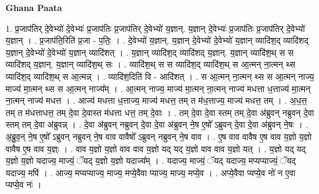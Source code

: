 \documentclass[17pt]{extarticle}
\begin{document}
\textbf{Ghana Paata } \newline

1. प्र॒जाप॑तिर् दे॒वेभ्यो॑ दे॒वेभ्यः॑ प्र॒जाप॑तिः प्र॒जाप॑तिर् दे॒वेभ्यो॑ य॒ज्ञान्. य॒ज्ञान् दे॒वेभ्यः॑ प्र॒जाप॑तिः प्र॒जाप॑तिर् दे॒वेभ्यो॑ य॒ज्ञान् । . प्र॒जाप॑ति॒रिति॑ प्र॒जा - प॒तिः॒ । . दे॒वेभ्यो॑ य॒ज्ञान्. य॒ज्ञान् दे॒वेभ्यो॑ दे॒वेभ्यो॑ य॒ज्ञान् व्यादि॑श॒द् व्यादि॑शद् य॒ज्ञान् दे॒वेभ्यो॑ दे॒वेभ्यो॑ य॒ज्ञान् व्यादि॑शत् । . य॒ज्ञान् व्यादि॑श॒द् व्यादि॑शद् य॒ज्ञान्. य॒ज्ञान् व्यादि॑श॒थ् स स व्यादि॑शद् य॒ज्ञान्. य॒ज्ञान् व्यादि॑श॒थ् सः । . व्यादि॑श॒थ् स स व्यादि॑श॒द् व्यादि॑श॒थ् स आ॒त्मन् ना॒त्मन् थ्स व्यादि॑श॒द् व्यादि॑श॒थ् स आ॒त्मन्न् । . व्यादि॑श॒दिति॑ वि - आदि॑शत् । . स आ॒त्मन् ना॒त्मन् थ्स स आ॒त्मन् नाज्य॒ माज्य॑ मा॒त्मन् थ्स स आ॒त्मन् नाज्य᳚म् । . आ॒त्मन् नाज्य॒ माज्य॑ मा॒त्मन् ना॒त्मन् नाज्य॑ मधत्ता ध॒त्ताज्य॑ मा॒त्मन् ना॒त्मन् नाज्य॑ मधत्त । . आज्य॑ मधत्ता ध॒त्ताज्य॒ माज्य॑ मधत्त॒ तम् त म॑ध॒त्ताज्य॒ माज्य॑ मधत्त॒ तम् । . अ॒ध॒त्त॒ तम् त म॑धत्ताधत्त॒ तम् दे॒वा दे॒वास्त म॑धत्ता धत्त॒ तम् दे॒वाः । . तम् दे॒वा दे॒वा स्तम् तम् दे॒वा अ॑ब्रुवन् नब्रुवन् दे॒वा स्तम् तम् दे॒वा अ॑ब्रुवन्न् । . दे॒वा अ॑ब्रुवन् नब्रुवन् दे॒वा दे॒वा अ॑ब्रुवन् ने॒ष ए॒षो᳚ ऽब्रुवन् दे॒वा दे॒वा अ॑ब्रुवन् ने॒षः । . अ॒ब्रु॒व॒न् ने॒ष ए॒षो᳚ ऽब्रुवन् नब्रुवन् ने॒ष वाव वावैषो᳚ ऽब्रुवन् नब्रुवन् ने॒ष वाव । . ए॒ष वाव वावैष ए॒ष वाव य॒ज्ञो य॒ज्ञो वावैष ए॒ष वाव य॒ज्ञ्ः । . वाव य॒ज्ञो य॒ज्ञो वाव वाव य॒ज्ञो यद् यद् य॒ज्ञो वाव वाव य॒ज्ञो यत् । . य॒ज्ञो यद् यद् य॒ज्ञो य॒ज्ञो यदाज्य॒ माज्यं॒ ॅयद् य॒ज्ञो य॒ज्ञो यदाज्य᳚म् । . यदाज्य॒ माज्यं॒ ॅयद् यदाज्य॒ मप्यप्याज्यं॒ ॅयद् यदाज्य॒ मपि॑ । . आज्य॒ मप्यप्याज्य॒ माज्य॒ मप्ये॒वैवा प्याज्य॒ माज्य॒ मप्ये॒व । . अप्ये॒वैवा प्यप्ये॒व नो॑ न ए॒वा प्यप्ये॒व नः॑ । \newline
\end{document}
